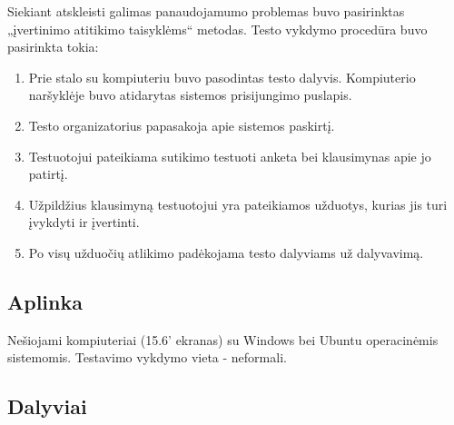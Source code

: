 		Siekiant atskleisti galimas panaudojamumo problemas buvo pasirinktas „įvertinimo atitikimo taisyklėms“ metodas.
		Testo vykdymo procedūra buvo pasirinkta tokia:
		\begin{enumerate}
			\item Prie stalo su kompiuteriu buvo pasodintas testo dalyvis. Kompiuterio naršyklėje buvo atidarytas sistemos prisijungimo puslapis.
			\item Testo organizatorius papasakoja apie sistemos paskirtį.
			\item Testuotojui pateikiama sutikimo testuoti anketa bei klausimynas apie jo patirtį.
			\item Užpildžius klausimyną testuotojui yra pateikiamos užduotys, kurias jis turi įvykdyti ir įvertinti.
			\item Po visų užduočių atlikimo padėkojama testo dalyviams už dalyvavimą.
		\end{enumerate}
	
	\subsection{Aplinka}
	
		Nešiojami kompiuteriai (15.6' ekranas) su Windows bei Ubuntu operacinėmis sistemomis.
		Testavimo vykdymo vieta - neformali.
	
	\subsection{Dalyviai}
	
